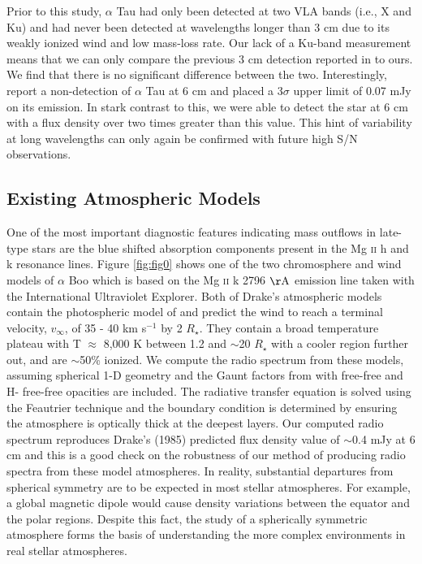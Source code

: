 \documentclass[iop]{emulateapj}
\begin{document}
Prior to this study, $\alpha$ Tau had only been detected at two VLA bands (i.e., X and Ku) and had never been detected at wavelengths longer than 3 cm due to its weakly ionized wind and low mass-loss rate. Our lack of a Ku-band measurement means that we can only compare the previous 3 cm detection reported in \cite{2007ApJ...655..946W} to ours. We find that there is no significant difference between the two. Interestingly, \cite{2007ApJ...655..946W} report a non-detection of $\alpha$ Tau at 6 cm and placed a 3$\sigma$ upper limit of 0.07 mJy on its emission. In stark contrast to this, we were able to detect the star at 6 cm with a flux density over two times greater than this value. This hint of variability at long wavelengths can only again be confirmed with future high S/N observations.


\subsection{Existing Atmospheric Models} \label{disc2}
One of the most important diagnostic features indicating mass outflows in late-type stars are the blue shifted absorption components present in the Mg {\textsc{ii}} h and k resonance lines. Figure \ref{fig:fig0} shows one of the two chromosphere and wind models of $\alpha$ Boo \citep{1985pssl.proc..351D} which is based on the Mg {\textsc{ii}} k 2796 $\rm{\AA}$ emission line taken with the International Ultraviolet Explorer. Both of Drake's atmospheric models contain the photospheric model of \cite{1975ApJ...200..660A} and predict the wind to reach a terminal velocity, $v_{\infty}$, of 35 - 40 km s${}^{-1}$ by 2 $R _{\star}$. They contain a broad temperature plateau with T $\approx$ 8,000 K between 1.2 and $\sim$20 $R _{\star}$ with a cooler region further out, and are $\sim$50\% ionized. We compute the radio spectrum from these models, assuming spherical 1-D geometry and the Gaunt factors from \cite{1988ApJ...327..477H} with free-free and H- free-free opacities are included. The radiative transfer equation is solved using the Feautrier technique \cite[see, e.g.,][]{1994MNRAS.268..894H} and the boundary condition is determined by ensuring the atmosphere is optically thick at the deepest layers. Our computed radio spectrum reproduces Drake's (1985) predicted flux density value of $\sim$0.4 mJy at 6 cm and this is a good check on the robustness of our method of producing radio spectra from these model atmospheres. In reality, substantial departures from spherical symmetry are to be expected in most stellar atmospheres. For example, a global magnetic dipole would cause density variations between the equator and the polar regions. Despite this fact, the study of a  spherically symmetric atmosphere forms the basis of understanding the more complex environments in real stellar atmospheres.
\end{document}
